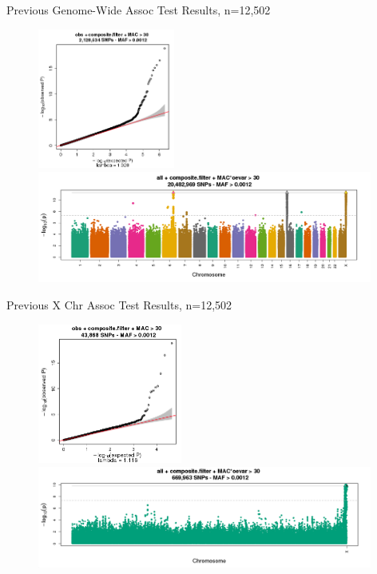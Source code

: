 \documentclass{beamer}
\begin{document}
\begin{frame}{Previous Genome-Wide Assoc Test Results, n=12,502}
\centering
\begin{figure}
\includegraphics[height=4.6cm]{../RBC_MLM-X_results/qq_obs_rbc.png}\\
\includegraphics[width=11cm]{../RBC_MLM-X_results/pval_manh_single_2014-08-12_04-43-43_316987.png}
\end{figure}
\end{frame}

\begin{frame}{Previous X Chr Assoc Test Results, n=12,502}
\centering
\begin{figure}
\includegraphics[height=4.6cm]{../RBC_MLM-X_results/pval_qq_filtered_2015-02-27_11-37-52_auto_316987_v2.png}\\
\includegraphics[width=11cm]{../RBC_MLM-X_results/pval_manh_single_2015-02-27_11-37-52_auto_316987_v2.png}
\end{figure}
\end{frame}
\end{document}
